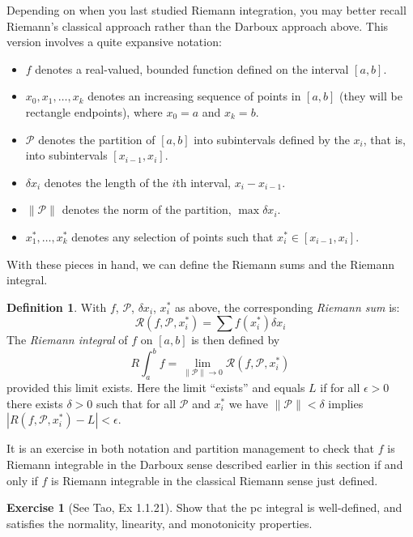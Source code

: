 \documentclass[11pt,oneside]{amsbook}
\theoremstyle{definition}
\newtheorem{exerc}{Exercise}[section]
\theoremstyle{plain}
\theoremstyle{definition}
\newtheorem{defn}[thm]{Definition}
\theoremstyle{remark}
\numberwithin{equation}{section}
\numberwithin{figure}{section}
\begin{document}
Depending on when you last studied Riemann integration, you may better recall Riemann's classical approach rather than the Darboux approach above. This version involves a quite expansive notation:

\begin{itemize}
\item $f$ denotes a real-valued, bounded function defined on the interval $[a,b]$.
\item $x_0,x_1,\ldots,x_k$ denotes an increasing sequence of points in $[a,b]$ (they will be rectangle endpoints), where $x_0=a$ and $x_k=b$.
\item $\mathcal P$ denotes the partition of $[a,b]$ into subintervals defined by the $x_i$, that is, into subintervals $[x_{i-1},x_i]$.
\item $\delta x_i$ denotes the length of the $i$th interval, $x_i-x_{i-1}$.
\item $\|\mathcal P\|$ denotes the norm of the partition, $\max\delta x_i$.
\item $x_1^*,\ldots,x_k^*$ denotes any selection of points such that $x_i^*\in[x_{i-1},x_i]$.
\end{itemize}

With these pieces in hand, we can define the Riemann sums and the Riemann integral.

\begin{defn}
  With $f$, $\mathcal P$, $\delta x_i$, $x_i^*$ as above, the corresponding \emph{Riemann sum} is:
  \[\mathcal R(f,\mathcal  P,x_i^*)=\sum f(x_i^*)\delta x_i
  \]
  The \emph{Riemann integral} of $f$ on $[a,b]$ is then defined by
  \[R\int_a^b f=\lim_{\|\mathcal P\|\to0}\mathcal R(f,\mathcal P,x_i^*)
  \]
  provided this limit exists. Here the limit ``exists'' and equals $L$ if for all $\epsilon>0$ there exists $\delta>0$ such that for all $\mathcal P$ and $x_i^*$ we have $\|\mathcal P\|<\delta$ implies $|R(f,\mathcal P,x_i^*)-L|<\epsilon$.
\end{defn}

It is an exercise in both notation and partition management to check that $f$ is Riemann integrable in the Darboux sense described earlier in this section if and only if $f$ is Riemann integrable in the classical Riemann sense just defined.

\begin{exerc}[See Tao, Ex 1.1.21]
  Show that the pc integral is well-defined, and satisfies the normality, linearity, and monotonicity properties.
\end{exerc}
\end{document}
